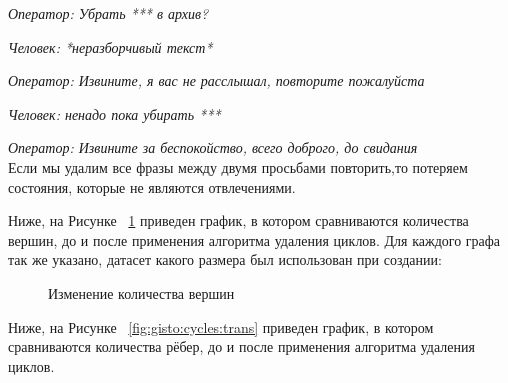\documentclass[times,specification,annotation]{itmo-student-thesis}
\begin{document}
	\textit{Оператор:  Убрать *** в архив?}
	
	\textit{Человек:  *неразборчивый текст*}
	
	\textit{Оператор:  Извините, я вас не расслышал, повторите пожалуйста}
	
	\textit{Человек:  ненадо пока убирать ***}
	
	\textit{Оператор:  Извините за беспокойство, всего доброго, до свидания}\\
	
	Если мы удалим все фразы между двумя просьбами повторить,то потеряем состояния, которые не являются отвлечениями.
		
	Ниже, на Рисунке ~\ref{fig:gisto:cycles:vertexes} приведен график, в котором сравниваются количества вершин, до и после применения  алгоритма удаления циклов. Для каждого графа так же указано, датасет какого размера был использован при создании:\\
	
	
	\begin{figure}[H]
		\caption{Изменение количества вершин}
		\label{fig:gisto:cycles:vertexes}
	\end{figure}

	Ниже, на Рисунке ~\ref{fig:gisto:cycles:trans} приведен график, в котором сравниваются количества рёбер, до и после применения  алгоритма удаления циклов.
	
\end{document}
